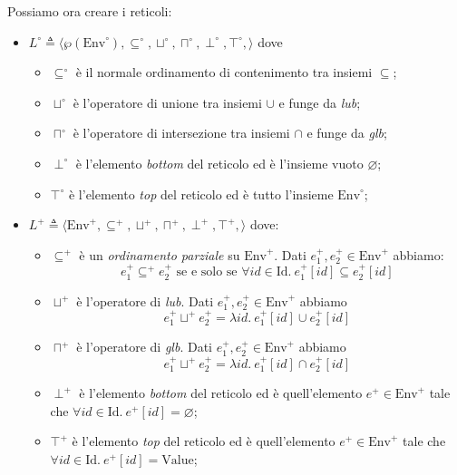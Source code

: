 \documentclass{article}
\begin{document}
Possiamo ora creare i reticoli:
\begin{itemize}
\item 
\( L^{\circ}\triangleq
\langle 
	\wp(\textrm{Env}^{\circ}),
	\subseteq^{\circ},
	\sqcup^{\circ},
	\sqcap^{\circ},
	\perp^{\circ},
	\top^{\circ},
\rangle\)
dove 
\begin{itemize}
	\item \(\subseteq^{\circ}\) è il normale ordinamento di contenimento tra insiemi \(\subseteq\);
	\item \(\sqcup^{\circ}\) è l'operatore di unione  tra insiemi \(\cup\) e funge da \textit{lub};
	\item \(\sqcap^{\circ}\) è l'operatore di intersezione tra insiemi \(\cap\) e funge da \textit{glb};
	\item \(\perp^{\circ}\) è l'elemento \textit{bottom} del reticolo ed è l'insieme vuoto \(\varnothing\);
	\item \(\top^{\circ}\) è l'elemento \textit{top} del reticolo ed è tutto l'insieme \(\textrm{Env}^{\circ}\);	
\end{itemize}
\item \(L^{+}\triangleq
\langle
	\textrm{Env}^{+}, 
	\subseteq^{+},
	\sqcup^{+},
	\sqcap^{+},
	\perp^{+},
	\top^{+},
\rangle\) dove:
\begin{itemize}
	\item \(\subseteq^{+}\) è un \textit{ordinamento parziale} su \(\textrm{Env}^{+}\). Dati \(e^+_1, e^+_2 \in\textrm{Env}^+\) abbiamo: 
	\[ e^+_1\subseteq^{+} e^+_2 \textrm{ se e solo se } \forall id\in\textrm{Id}.\ e^+_1[id]\subseteq e^+_2[id]\]
	\item \(\sqcup^{+}\) è l'operatore di \textit{lub}. Dati \(e^+_1, e^+_2 \in\textrm{Env}^+\) abbiamo
	\[ e^+_1\sqcup^{+} e^+_2 = \lambda id.\  e^+_1[id]\cup e^+_2[id]\]
	\item \(\sqcap^{+}\) è l'operatore di \textit{glb}. Dati \(e^+_1, e^+_2 \in\textrm{Env}^+\) abbiamo
	\[ e^+_1\sqcup^{+} e^+_2 = \lambda id.\  e^+_1[id]\cap e^+_2[id]\]
	\item \(\perp^{+}\) è l'elemento \textit{bottom} del reticolo ed è quell'elemento \(e^+\in\textrm{Env}^+\) tale che \(\forall id\in\textrm{Id}.\  e^+[id] = \varnothing\);
	\item \(\top^{+}\) è l'elemento \textit{top} del reticolo ed è quell'elemento \(e^+\in\textrm{Env}^+\) tale che \(\forall id\in\textrm{Id}.\  e^+[id] = \textrm{Value}\);
\end{itemize}
\end{itemize}
\end{document}

